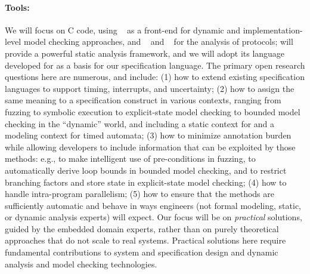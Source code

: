 \paragraph{Tools:} We will focus on C code, using \deepstate~\cite{DeepState}
as a front-end for dynamic and implementation-level model checking approaches, and
\uppaal~\cite{uppaal} and
\prism~\cite{KNP2011:CAV} for the analysis of protocols; \framac will
provide a powerful static analysis framework, and we will adopt its
\acsl language developed for \framac as a basis for our specification language.  The primary open research questions here are numerous, and include:
(1) how to extend existing specification languages to support timing, interrupts,
and uncertainty;
(2) how to assign the same meaning to a specification construct in
  various contexts, ranging from fuzzing to symbolic execution to
  explicit-state model checking to bounded model checking in the
  ``dynamic'' \deepstate world, and including a static context for
  \framac and a modeling context for timed automata;
(3) how to minimize annotation burden while allowing developers to
include information that can be exploited by those methods: e.g., to
make intelligent use of pre-conditions in fuzzing, to automatically
derive loop bounds in bounded model checking, and to restrict
branching factors and store state in explicit-state model checking;
(4) how to handle intra-program parallelism;
(5) how to ensure that the methods are sufficiently automatic
  and behave in ways engineers (not formal modeling, static, or dynamic
  analysis experts) will expect.
Our focus will be on \emph{practical} solutions, guided by the
embedded domain experts, rather than on purely theoretical approaches
that do not scale to real systems. Practical solutions here require
fundamental contributions to system and specification design and
dynamic analysis and model checking technologies.

\paragraph{}


